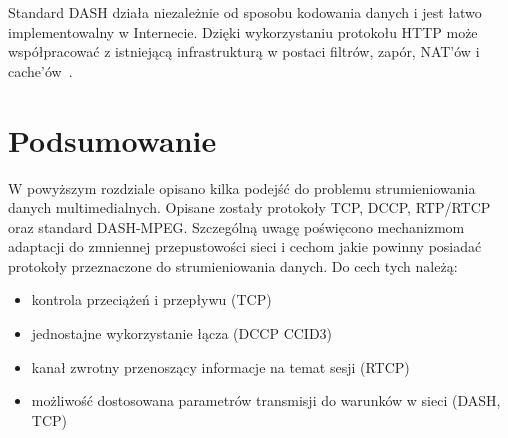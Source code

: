 Standard DASH działa niezależnie od sposobu kodowania danych i jest łatwo implementowalny w Internecie. Dzięki wykorzystaniu protokołu HTTP może współpracować z istniejącą infrastrukturą w postaci filtrów, zapór, NAT'ów i cache'ów~\cite{DASH}.

\section{Podsumowanie}

W powyższym rozdziale opisano kilka podejść do problemu strumieniowania danych multimedialnych. Opisane zostały protokoły TCP, DCCP, RTP/RTCP oraz standard DASH-MPEG. Szczególną uwagę poświęcono mechanizmom adaptacji do zmniennej przepustowości sieci i cechom jakie powinny posiadać protokoły przeznaczone do strumieniowania danych. Do cech tych należą:
\begin{itemize}
\item kontrola przeciążeń i przepływu (TCP)
\item jednostajne wykorzystanie łącza (DCCP CCID3)
\item kanał zwrotny przenoszący informacje na temat sesji (RTCP)
\item możliwość dostosowana parametrów transmisji do warunków w sieci (DASH, TCP)
\end{itemize}

